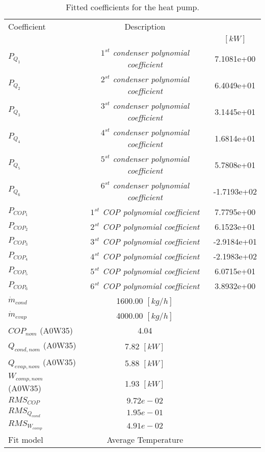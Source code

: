 \documentclass[english]{SPFShortReport}
\author{Dani Carbonell}
\begin{document}
\begin{table}[!ht]
\begin{small}
\caption{Fitted coefficients for the heat pump.}
\begin{center}
\resizebox{12cm}{!} 
{
\begin{tabular}{l | c c } 
\hline
\hline
Coefficient &Description & \\ 
 & &$[kW]$\\ 
\hline
$P_{Q_{1}}$ & \emph{$1^{st}$ condenser polynomial coefficient}  & 7.1081e+00    \\ 
$P_{Q_{2}}$ & \emph{$2^{st}$ condenser polynomial coefficient}  & 6.4049e+01    \\ 
$P_{Q_{3}}$ & \emph{$3^{st}$ condenser polynomial coefficient}  & 3.1445e+01    \\ 
$P_{Q_{4}}$ & \emph{$4^{st}$ condenser polynomial coefficient}  & 1.6814e+01    \\ 
$P_{Q_{5}}$ & \emph{$5^{st}$ condenser polynomial coefficient}  & 5.7808e+01    \\ 
$P_{Q_{6}}$ & \emph{$6^{st}$ condenser polynomial coefficient}  & -1.7193e+02    \\ 
\hline
$P_{COP_{1}}$ & \emph{$1^{st}$ COP polynomial coefficient}  & 7.7795e+00    \\ 
$P_{COP_{2}}$ & \emph{$2^{st}$ COP polynomial coefficient}  & 6.1523e+01    \\ 
$P_{COP_{3}}$ & \emph{$3^{st}$ COP polynomial coefficient}  & -2.9184e+01    \\ 
$P_{COP_{4}}$ & \emph{$4^{st}$ COP polynomial coefficient}  & -2.1983e+02    \\ 
$P_{COP_{5}}$ & \emph{$5^{st}$ COP polynomial coefficient}  & 6.0715e+01    \\ 
$P_{COP_{6}}$ & \emph{$6^{st}$ COP polynomial coefficient}  & 3.8932e+00    \\ 
\hline
$\dot m_{cond}$ & 1600.00 $[kg/h]$ \\ 
$\dot m_{evap}$ & 4000.00 $[kg/h]$ \\ 
\hline
$COP_{nom}$ (A0W35)& 4.04 \\ 
$Q_{cond,nom}$ (A0W35)& 7.82 $[kW]$\\ 
$Q_{evap,nom}$ (A0W35)& 5.88 $[kW]$\\ 
$W_{comp,nom}$ (A0W35)& 1.93 $[kW]$\\ 
\hline
 $RMS_{COP}$ & $9.72e-02$ \\ 
 $RMS_{Q_{cond}}$ & $1.95e-01$ \\ 
 $RMS_{W_{comp}}$ & $4.91e-02$ \\ 
\hline
Fit model & Average Temperature\\ 
\hline
\hline
\end{tabular}
}
\label{CoefTable}
\end{center}
\end{small}
\end{table}
\end{document}
